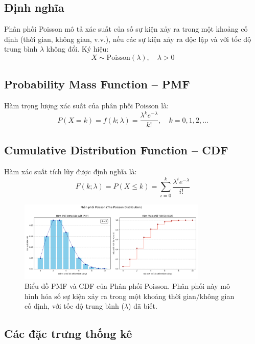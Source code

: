 \subsection{Định nghĩa}

Phân phối Poisson mô tả xác suất của số sự kiện xảy ra trong một khoảng cố định (thời gian, không gian, v.v.),  
nếu các sự kiện xảy ra độc lập và với tốc độ trung bình $\lambda$ không đổi.  
Ký hiệu:
\[
X \sim \mathrm{Poisson}(\lambda), \quad \lambda > 0
\]

\subsection{Probability Mass Function – PMF}

Hàm trọng lượng xác suất của phân phối Poisson là:
\[
P(X = k) = f(k; \lambda) = \frac{\lambda^k e^{-\lambda}}{k!}, \quad k = 0, 1, 2, \dots
\]

\subsection{Cumulative Distribution Function – CDF}

Hàm xác suất tích lũy được định nghĩa là:
\[
F(k; \lambda) = P(X \le k) = \sum_{i=0}^k \frac{\lambda^i e^{-\lambda}}{i!}
\]

\begin{figure}[h!]
    \centering
    \includegraphics[width=0.8\textwidth]{images/Poisson_PMF_and_CDF.png}
    \caption{Biểu đồ PMF và CDF của Phân phối Poisson. Phân phối này mô hình hóa số sự kiện xảy ra trong một khoảng thời gian/không gian cố định, với tốc độ trung bình ($\lambda$) đã biết.}
    \label{fig:poisson_dist}
\end{figure}
\subsection{Các đặc trưng thống kê}

